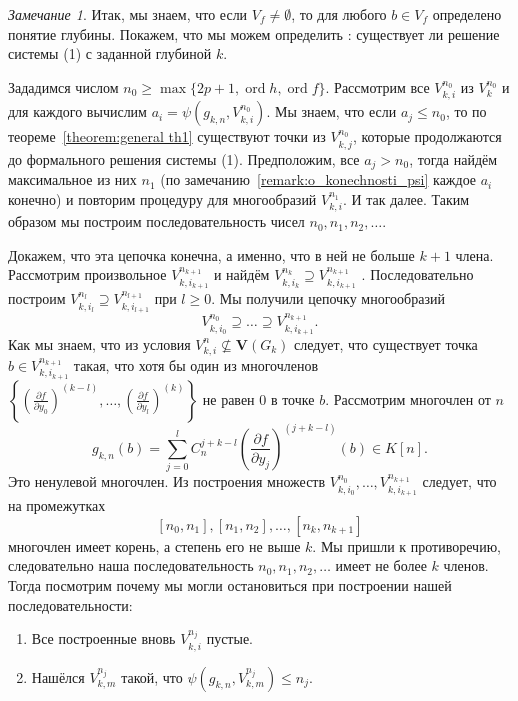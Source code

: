 \documentclass[16pt]{article}
\DeclareMathOperator{\ord}{ord}
\renewcommand{\le}{\leqslant} %
\renewcommand{\ge}{\geqslant} %
\theoremstyle{plain1}
\theoremstyle{plain2}
\theoremstyle{plain}
\theoremstyle{plain3}
\theoremstyle{definition}
\theoremstyle{remark}
\newtheorem{remark}[theorem1]{Замечание}
\begin{document}
\begin{remark}\label{remark:o_syshestvovvanii reshenia c zadannoi glubinoi}
Итак, мы знаем, что если ${V}_f\neq\emptyset$, то для любого $b\in {V}_f$ определено понятие глубины. Покажем, что мы можем определить : существует ли решение системы (1) с заданной глубиной $k$.

Зададимся числом $n_0\ge\max\{ 2p+1,\ord{h},\ord{f}\}$. Рассмотрим все ${V}_{k,i}^{n_0}$ из $V_k^{n_0}$  и для каждого вычислим $a_i=\psi(g_{k,n}, {V}_{k,i}^{n_0})$. Мы знаем, что если $a_j\le n_0$, то по теореме~\ref{theorem:general th1} существуют точки из ${V}_{k,j}^{n_0}$, которые продолжаются до формального решения системы (1). Предположим, все $a_j>n_0$, тогда найдём максимальное из них $n_1$ (по замечанию~\ref{remark:o_konechnosti_psi} каждое $a_i$ конечно) и повторим процедуру для многообразий ${V}_{k,i}^{n_1}$. И так далее. Таким образом мы построим последовательность чисел $n_0,n_1,n_2,\ldots$.

Докажем, что эта цепочка конечна, а именно, что в ней не больше $k+1$ члена. Рассмотрим произвольное ${V}_{k,i_{k+1}}^{n_{k+1}}$  и найдём ${V}_{k,i_{k}}^{n_{k}}\supseteq {V}_{k,i_{k+1}}^{n_{k+1}}$ . Последовательно построим ${V}_{k,i_{l}}^{n_{l}}\supseteq {V}_{k,i_{l+1}}^{n_{l+1}}$ при $l\ge 0$. Мы получили цепочку многообразий
$$
{V}_{k,i_{0}}^{n_{0}}\supseteq\ldots\supseteq {V}_{k,i_{k+1}}^{n_{k+1}}.
$$
   Как мы знаем, что из условия ${V}_{k,i}^n \not\subseteq \mathbf{V}(G_k)$ следует, что существует точка $b\in {V}_{k,i_{k+1}}^{n_{k+1}}$ такая, что хотя бы один из многочленов $\left\{\left(\frac{\partial f}{\partial y_0}\right)^{(k-l)},\ldots, \left(\frac{\partial f}{\partial y_l}\right)^{(k)} \right\}$ не равен 0 в точке $b$.
Рассмотрим многочлен от $n$
$$
g_{k,n}(b)=\sum\limits_{j=0}^{l}C_n^{j+k - l }\left(\frac{\partial f}{\partial y_j}\right)^{(j+k - l)}(b)\in K[n].
$$
Это ненулевой многочлен. Из построения множеств ${V}_{k,i_{0}}^{n_{0}},\ldots, {V}_{k,i_{k+1}}^{n_{k+1}}$ следует, что на промежутках $$[n_0,n_1],[n_1,n_2],\ldots,[n_k,n_{k+1}]$$
многочлен имеет корень, а степень его не выше $k$. Мы пришли к противоречию, следовательно наша последовательность  $n_0,n_1,n_2,\ldots$ имеет не более $k$ членов. Тогда посмотрим почему мы могли остановиться при построении нашей последовательности:

\begin{enumerate}
  \item Все построенные вновь ${V}_{k,i}^{n_j}$ пустые.
  \item Нашёлся ${V}_{k,m}^{n_j}$ такой, что $ \psi(g_{k,n},{V}_{k,m}^{n_j})\le n_j$.
\end{enumerate}


\end{remark}
\end{document}
